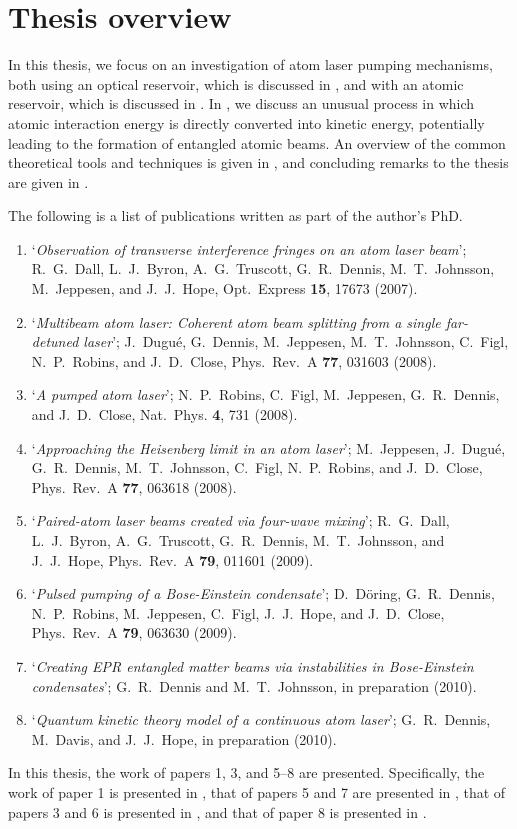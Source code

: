 \section{Thesis overview}

In this thesis, we focus on an investigation of atom laser pumping mechanisms, both using an optical reservoir, which is discussed in , and with an atomic reservoir, which is discussed in .  In , we discuss an unusual process in which atomic interaction energy is directly converted into kinetic energy, potentially leading to the formation of entangled atomic beams.  An overview of the common theoretical tools and techniques is given in , and concluding remarks to the thesis are given in .

\parasep

The following is a list of publications written as part of the author's PhD.
\begin{enumerate}
    \item `\emph{Observation of transverse interference fringes on an atom laser beam}'; R.~G.~Dall, L.~J.~Byron, A.~G.~Truscott, G.~R.~Dennis, M.~T.~Johnsson, M.~Jeppesen, and J.~J.~Hope, Opt.~Express \textbf{15}, 17673 (2007).
    \item `\emph{Multibeam atom laser: Coherent atom beam splitting from a single far-detuned laser}'; J.~Dugué, G.~Dennis, M.~Jeppesen, M.~T.~Johnsson, C.~Figl, N.~P.~Robins, and J.~D.~Close, Phys.~Rev.~A \textbf{77}, 031603 (2008).
    \item `\emph{A pumped atom laser}'; N.~P.~Robins, C.~Figl, M.~Jeppesen, G.~R.~Dennis, and J.~D.~Close, Nat.~Phys. \textbf{4}, 731 (2008).
    \item `\emph{Approaching the Heisenberg limit in an atom laser}'; M.~Jeppesen, J.~Dugué, G.~R.~Dennis, M.~T.~Johnsson, C.~Figl, N.~P.~Robins, and J.~D.~Close, Phys.~Rev.~A \textbf{77}, 063618 (2008).
    \item `\emph{Paired-atom laser beams created via four-wave mixing}'; R.~G.~Dall, L.~J.~Byron, A.~G.~Truscott, G.~R.~Dennis, M.~T.~Johnsson, and J.~J.~Hope, Phys.~Rev.~A \textbf{79}, 011601 (2009).
    \item `\emph{Pulsed pumping of a Bose-Einstein condensate}'; D.~Döring, G.~R.~Dennis, N.~P.~Robins, M.~Jeppesen, C.~Figl, J.~J.~Hope, and J.~D.~Close, Phys.~Rev.~A \textbf{79}, 063630 (2009).
    \item `\emph{Creating EPR entangled matter beams via instabilities in Bose-Einstein condensates}'; G.~R.~Dennis and M.~T.~Johnsson, in preparation (2010).
    \item `\emph{Quantum kinetic theory model of a continuous atom laser}'; G.~R.~Dennis, M.~Davis, and J.~J.~Hope, in preparation (2010).
\end{enumerate}
In this thesis, the work of papers 1, 3, and 5--8 are presented.  Specifically, the work of paper 1 is presented in , that of papers 5 and 7 are presented in , that of papers 3 and 6 is presented in , and that of paper 8 is presented in .
